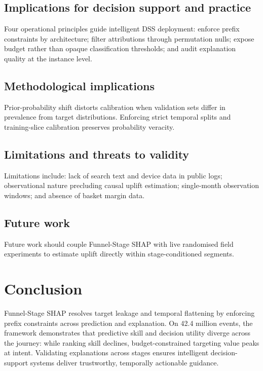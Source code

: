 \documentclass[a4paper]{article}
\begin{document}
\subsection{Implications for decision support and practice}
\label{sec:discussion-practice}

Four operational principles guide intelligent DSS deployment: enforce prefix
constraints by architecture; filter attributions through permutation nulls; expose
budget rather than opaque classification thresholds; and audit explanation quality
at the instance level.

\subsection{Methodological implications}
\label{sec:discussion-method}

Prior-probability shift distorts calibration when validation sets differ in prevalence
from target distributions. Enforcing strict temporal splits and training-slice
calibration preserves probability veracity.

\subsection{Limitations and threats to validity}
\label{sec:limitations}

Limitations include: lack of search text and device data in public logs; observational
nature precluding causal uplift estimation; single-month observation windows; and
absence of basket margin data.

\subsection{Future work}
\label{sec:future}

Future work should couple Funnel-Stage SHAP with live randomised field experiments
to estimate uplift directly within stage-conditioned segments.

\section{Conclusion}
\label{sec:conclusion}

Funnel-Stage SHAP resolves target leakage and temporal flattening by enforcing prefix
constraints across prediction and explanation. On 42.4 million events, the framework
demonstrates that predictive skill and decision utility diverge across the journey:
while ranking skill declines, budget-constrained targeting value peaks at intent.
Validating explanations across stages ensures intelligent decision-support systems
deliver trustworthy, temporally actionable guidance.
\end{document}
